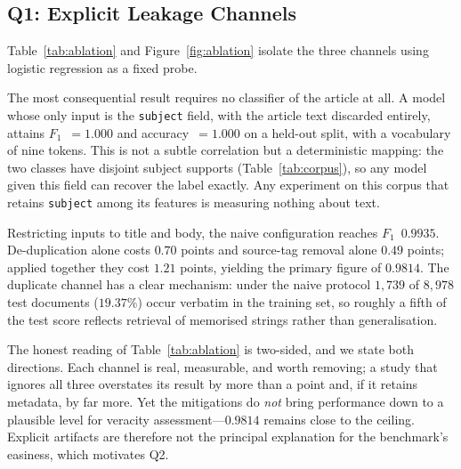 \documentclass[conference]{IEEEtran}
\newcommand{\Fone}{$F_1$}
\begin{document}
\subsection{Q1: Explicit Leakage Channels}
\label{sec:results-ablation}
Table~\ref{tab:ablation} and Figure~\ref{fig:ablation} isolate the three
channels using logistic regression as a fixed probe.

The most consequential result requires no classifier of the article at all. A
model whose only input is the \texttt{subject} field, with the article text
discarded entirely, attains \Fone{}~$=1.000$ and accuracy~$=1.000$ on a
held-out split, with a vocabulary of nine tokens. This is not a subtle
correlation but a deterministic mapping: the two classes have disjoint subject
supports (Table~\ref{tab:corpus}), so any model given this field can recover
the label exactly. Any experiment on this corpus that retains \texttt{subject}
among its features is measuring nothing about text.

Restricting inputs to title and body, the naive configuration reaches
\Fone{}~$0.9935$. De-duplication alone costs $0.70$ points and source-tag
removal alone $0.49$ points; applied together they cost $1.21$ points, yielding
the primary figure of $0.9814$. The duplicate channel has a clear mechanism:
under the naive protocol $1{,}739$ of $8{,}978$ test documents ($19.37\%$) occur
verbatim in the training set, so roughly a fifth of the test score reflects
retrieval of memorised strings rather than generalisation.

The honest reading of Table~\ref{tab:ablation} is two-sided, and we state both
directions. Each channel is real, measurable, and worth removing; a study that
ignores all three overstates its result by more than a point and, if it retains
metadata, by far more. Yet the mitigations do \emph{not} bring performance down
to a plausible level for veracity assessment---$0.9814$ remains close to the
ceiling. Explicit artifacts are therefore not the principal explanation for the
benchmark's easiness, which motivates Q2.
\end{document}
